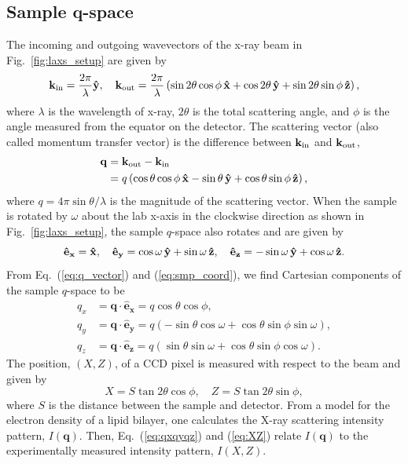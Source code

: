 \subsection{Sample q-space}\label{sec:sample_q-space}
The incoming and outgoing wavevectors of the x-ray beam in Fig.~\ref{fig:laxs_setup}
are given by
\begin{equation}
  \mathbf{k}_{\mathrm{in}} = \frac{2\pi}{\lambda} \mathbf{\hat{y}}, \quad
  \mathbf{k}_{\mathrm{out}} = 
    \frac{2\pi}{\lambda} \left( 
      \sin 2\theta \cos\phi \, \mathbf{\hat{x}}
      + \cos 2\theta \, \mathbf{\hat{y}}
      + \sin 2\theta \sin\phi \, \mathbf{\hat{z}} 
    \right),
\end{equation}
where $\lambda$ is the wavelength of x-ray, $2\theta$ is the total scattering
angle, and $\phi$ is the angle measured from the equator on the detector. 
The scattering vector (also called
momentum transfer vector) is
the difference between $\mathbf{k}_{\mathrm{in}}$ and $\mathbf{k}_{\mathrm{out}}$,
\begin{align}
  \mathbf{q} &= \mathbf{k}_{\mathrm{out}} - \mathbf{k}_{\mathrm{in}} \nonumber \\
             &= q \left( 
                  \cos\theta\cos\phi \, \mathbf{\hat{x}} - \sin\theta \, \mathbf{\hat{y}}
                  + \cos\theta\sin\phi \, \mathbf{\hat{z}}
                \right),
  \label{eq:q_vector}
\end{align}
where $q=4\pi\sin\theta/\lambda$ is the magnitude of the scattering vector. 
When the sample is rotated by $\omega$ about the lab x-axis in the clockwise 
direction as shown in Fig.~\ref{fig:laxs_setup}, the sample $q$-space also rotates and 
are given by  
\begin{equation}
  \mathbf{\hat{e}_x} = \mathbf{\hat{x}}, \quad
  \mathbf{\hat{e}_y} = \cos\omega\,\mathbf{\hat{y}} + \sin\omega\,\mathbf{\hat{z}}, \quad
  \mathbf{\hat{e}_z} = -\sin\omega\,\mathbf{\hat{y}} + \cos\omega\,\mathbf{\hat{z}}.
  \label{eq:smp_coord}
\end{equation}
From Eq.~(\ref{eq:q_vector}) and (\ref{eq:smp_coord}), we find Cartesian
components of the sample $q$-space to be
\begin{align}
  q_x &= \mathbf{q}\cdot\mathbf{\hat{e}_x} 
       = q\cos\theta\cos\phi, 
       \nonumber\\
  q_y &= \mathbf{q}\cdot\mathbf{\hat{e}_y} 
       = q\left(-\sin\theta\cos\omega + \cos\theta\sin\phi\sin\omega\right), 
       \nonumber\\
  q_z &= \mathbf{q}\cdot\mathbf{\hat{e}_z} 
       = q\left(\sin\theta\sin\omega + \cos\theta\sin\phi\cos\omega\right).
       \label{eq:qxqyqz}
\end{align}
The position, $(X,Z)$, of a CCD pixel is measured with respect to the beam 
and given by
\begin{equation}
  X = S \tan 2\theta \cos\phi, \quad Z = S \tan 2\theta \sin\phi,
  \label{eq:XZ}
\end{equation} 
where $S$ is the distance between the sample and detector.
From a model for the electron density of a lipid bilayer, one calculates
the X-ray scattering intensity pattern, $I(\mathbf{q})$. Then, Eq.~(\ref{eq:qxqyqz})
and (\ref{eq:XZ}) relate $I(\mathbf{q})$ to the experimentally measured
intensity pattern, $I(X,Z)$. 


